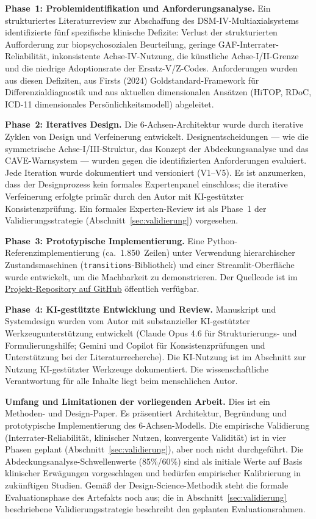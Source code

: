 \documentclass[11pt,a4paper]{article}
\begin{document}
\textbf{Phase~1: Problemidentifikation und Anforderungsanalyse.} Ein strukturiertes Literaturreview zur Abschaffung des DSM-IV-Multiaxialsystems identifizierte f\"unf spezifische klinische Defizite: Verlust der strukturierten Aufforderung zur biopsychosozialen Beurteilung, geringe GAF-Interrater-Reliabilit\"at, inkonsistente Achse-IV-Nutzung, die k\"unstliche Achse-I/II-Grenze und die niedrige Adoptionsrate der Ersatz-V/Z-Codes. Anforderungen wurden aus diesen Defiziten, aus Firsts (2024) Goldstandard-Framework f\"ur Differenzialdiagnostik und aus aktuellen dimensionalen Ans\"atzen (HiTOP, RDoC, ICD-11 dimensionales Pers\"onlichkeitsmodell) abgeleitet.

\textbf{Phase~2: Iteratives Design.} Die 6-Achsen-Architektur wurde durch iterative Zyklen von Design und Verfeinerung entwickelt. Designentscheidungen --- wie die symmetrische Achse-I/III-Struktur, das Konzept der Abdeckungsanalyse und das CAVE-Warnsystem --- wurden gegen die identifizierten Anforderungen evaluiert. Jede Iteration wurde dokumentiert und versioniert (V1--V5). Es ist anzumerken, dass der Designprozess kein formales Expertenpanel einschloss; die iterative Verfeinerung erfolgte prim\"ar durch den Autor mit KI-gest\"utzter Konsistenzpr\"ufung. Ein formales Experten-Review ist als Phase~1 der Validierungsstrategie (Abschnitt~\ref{sec:validierung}) vorgesehen.

\textbf{Phase~3: Prototypische Implementierung.} Eine Python-Referenzimplementierung (ca.\ 1.850~Zeilen) unter Verwendung hierarchischer Zustandsmaschinen (\texttt{transitions}-Bibliothek) und einer Streamlit-Oberfl\"ache wurde entwickelt, um die Machbarkeit zu demonstrieren. Der Quellcode ist im \href{https://github.com/research-line/multiaxial-diagnostic-system}{Projekt-Repository auf GitHub} \"offentlich verf\"ugbar.

\textbf{Phase~4: KI-gest\"utzte Entwicklung und Review.} Manuskript und Systemdesign wurden vom Autor mit substanzieller KI-gest\"utzter Werkzeugunterst\"utzung entwickelt (Claude Opus 4.6 f\"ur Strukturierungs- und Formulierungshilfe; Gemini und Copilot f\"ur Konsistenzpr\"ufungen und Unterst\"utzung bei der Literaturrecherche). Die KI-Nutzung ist im Abschnitt zur Nutzung KI-gest\"utzter Werkzeuge dokumentiert. Die wissenschaftliche Verantwortung f\"ur alle Inhalte liegt beim menschlichen Autor.

\textbf{Umfang und Limitationen der vorliegenden Arbeit.} Dies ist ein Methoden- und Design-Paper. Es pr\"asentiert Architektur, Begr\"undung und prototypische Implementierung des 6-Achsen-Modells. Die empirische Validierung (Interrater-Reliabilit\"at, klinischer Nutzen, konvergente Validit\"at) ist in vier Phasen geplant (Abschnitt~\ref{sec:validierung}), aber noch nicht durchgef\"uhrt. Die Abdeckungsanalyse-Schwellenwerte (85\%/60\%) sind als initiale Werte auf Basis klinischer Erw\"agungen vorgeschlagen und bed\"urfen empirischer Kalibrierung in zuk\"unftigen Studien. Gem\"a\ss{} der Design-Science-Methodik \citep{Hevner2004, Peffers2007} steht die formale Evaluationsphase des Artefakts noch aus; die in Abschnitt~\ref{sec:validierung} beschriebene Validierungsstrategie beschreibt den geplanten Evaluationsrahmen.
\end{document}
